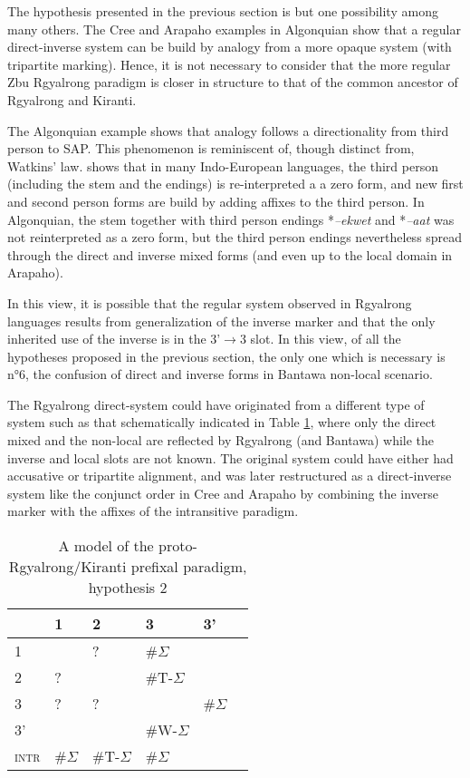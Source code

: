 \documentclass[twoside,a4paper,11pt]{article}
\newcommand{\ipa}[1]{{\phon\textit{#1}}}
\newcommand{\grise}[1]{\cellcolor{lightgray}\textbf{#1}}
\newcommand{\Σ}{\greek{Σ}}
\newcommand{\ro}{$\Sigma$}
\begin{document}
The hypothesis presented in the previous section is but one possibility among many others. The Cree and Arapaho examples in Algonquian show that a regular direct-inverse system can be build by analogy from a more opaque system (with tripartite marking). Hence, it is not necessary to consider that the more regular Zbu Rgyalrong paradigm is closer in structure to that of the  common ancestor of Rgyalrong and Kiranti.

The Algonquian example shows that analogy follows a directionality from third person to SAP. This phenomenon is reminiscent of, though distinct from, Watkins' law. \citet[96]{watkins62celtic} shows that in many Indo-European languages, the third person (including the stem and the endings) is re-interpreted a a zero form, and new first and second person forms are build by adding affixes to the third person. In Algonquian, the stem together with third person endings *\ipa{--ekwet} and *\ipa{--aat} was not reinterpreted as a zero form, but the third person endings nevertheless spread through the direct and inverse mixed forms (and even up to the local domain in Arapaho).

In this view, it is possible that the regular system observed in Rgyalrong languages results from generalization of the inverse marker and that the only inherited use of the inverse is in the 3'$\rightarrow$3 slot. In this view, of all the hypotheses proposed in the previous section,  the only one which is necessary is n°6, the confusion of direct and inverse forms in Bantawa non-local scenario.

The Rgyalrong direct-system could have originated from a different type of system such as that schematically indicated in Table \ref{tab:proto.st2}, where only the direct mixed and the non-local are   reflected by Rgyalrong (and Bantawa) while the inverse and local slots are not known.  The original system could have either had  accusative or tripartite alignment, and was later restructured as a direct-inverse system like the conjunct order  in Cree and Arapaho by combining the inverse marker with the affixes of the intransitive paradigm.


\begin{table}[H] 
\caption{A model of the proto-Rgyalrong/Kiranti prefixal paradigm, hypothesis 2} 
 \centering \label{tab:proto.st2}
\begin{tabular}{l|lllll} 
\toprule
&1 & 2 &3 & 3'\\
\hline
1 &\grise{} & ? &  \#\ro{} \\
2&? & \grise{} &\#T-\ro{}\\
3&?& ? & \grise{} &\#\ro{} \\
3'&&&\#W-\ro{} \\
\hline
\textsc{intr}&\#\ro{}&\#T-\ro{}&\#\ro{}\\
\bottomrule
\end{tabular}
\end{table}
\end{document}

